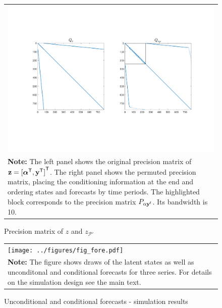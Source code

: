 \documentclass[notitlepage,a4paper,12pt]{article}
\newcommand{\transpose}[1]{{#1}^{\sf{T}}}
\begin{document}
\begin{figure}[htbp] \centering
    \caption{Precision matrix of $z$ and $z_{\mathcal{P}'}$\label{fig_Pperm}}
    \footnotesize
    \begin{tabular}{p{16cm}}
    \includegraphics*[scale=0.5,clip,trim=10 60 10 60]{../figures/fig_P_perm.pdf} \\
    \footnotesize \textbf{Note:} The left panel shows the original precision matrix of $\mathbf{z} = \transpose{[\transpose{\boldsymbol{\alpha}}, \transpose{\mathbf{y}}]}$. The right panel shows the permuted precision matrix, placing the conditioning information at the end and ordering states and forecasts by time periods. The highlighted block corresponds to the precision matrix $P_{\alpha\mathbf{y}^{\sf{f}}}$. Its bandwidth is 10. 
    \end{tabular}
    \newline
    \normalsize
\end{figure}

\begin{figure}[htbp] \centering
    \caption{Unconditional and conditional forecasts - simulation results\label{fig_simfore}}
    \footnotesize
    \begin{tabular}{p{16cm}}
    \texttt{[image: ../figures/fig\_fore.pdf]} \\
    \footnotesize \textbf{Note:} The figure shows draws of the latent states as well as unconditonal and conditional forecasts for three series. For details on the simulation design see the main text.
    \end{tabular}
    \newline
    \normalsize
\end{figure}
\end{document}
